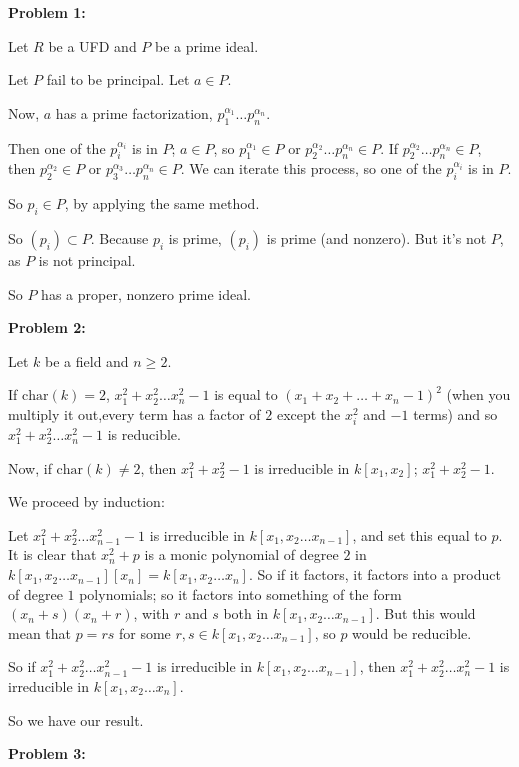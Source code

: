 \documentclass[a4paper,12pt]{article}
\newcommand{\tab}{\hspace{4mm}} %
\newcommand{\shunt}{\vspace{20mm}}
\newcommand{\al}{\alpha} %
\begin{document}
{\bf Problem 1:} 

Let $R$ be a UFD and $P$ be a prime ideal.

Let $P$ fail to be principal. Let $a \in P$.

Now, $a$ has a prime factorization, $p_1^{\al_1}\ldots p_n^{\al_n}$.

Then one of the $p_i^{\al_i}$ is in $P$; $a \in P$, so $p_1^{\al_1} \in P$ or $p_2^{\al_2}\ldots p_n^{\al_n} \in P$. If $p_2^{\al_2}\ldots p_n^{\al_n} \in P$, then $p_2^{\al_2} \in P$ or $p_3^{\al_3}\ldots p_n^{\al_n} \in P$. We can iterate this process, so one of the $p_i^{\al_i}$ is in $P$.

So $p_i \in P$, by applying the same method.

So $(p_i) \subset P$. Because $p_i$ is prime, $(p_i)$ is prime (and nonzero). But it's not $P$, as $P$ is not principal.

So $P$ has a proper, nonzero prime ideal. 

\shunt

{\bf Problem 2:} 

Let $k$ be a field and $n \geq 2$.

If $\text{char}(k) = 2$, $x_1^2 + x_2^2 \ldots x_n^2 -1$ is equal to $(x_1+x_2+\ldots+x_n-1)^2$ (when you multiply it out,every term has a factor of $2$ except the $x_i^2$ and $-1$ terms) and so $x_1^2 + x_2^2 \ldots x_n^2 -1$ is reducible.

Now, if $\text{char}(k) \neq 2$, then $x_1^2 +x_2^2 -1$ is irreducible in $k[x_1,x_2]$; $x_1^2+x_2^2 -1$.

We proceed by induction:

\tab Let $x_1^2 + x_2^2 \ldots x_{n-1}^2 -1$ is irreducible in $k[x_1, x_2 \ldots x_{n-1}]$, and set this equal to $p$. It is clear that $x_n^2+p$ is a monic polynomial of degree $2$ in $k[x_1, x_2 \ldots x_{n-1}][x_n] = k[x_1, x_2 \ldots x_{n}]$. So if it factors, it factors into a product of degree $1$ polynomials; so it factors into something of the form $(x_n+s)(x_n+r)$, with $r$ and $s$ both in $k[x_1, x_2 \ldots x_{n-1}]$. But this would mean that $p=rs$ for some $r,s \in k[x_1, x_2 \ldots x_{n-1}]$, so $p$ would be reducible.

\tab So if $x_1^2 + x_2^2 \ldots x_{n-1}^2 -1$ is irreducible in $k[x_1, x_2 \ldots x_{n-1}]$, then $x_1^2 + x_2^2 \ldots x_{n}^2 -1$ is irreducible in $k[x_1, x_2 \ldots x_{n}]$.

So we have our result. 


\shunt

{\bf Problem 3:} %
\end{document}
